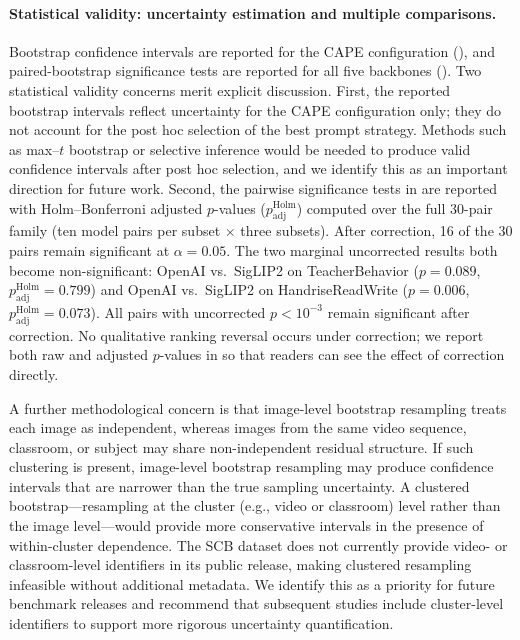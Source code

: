 \documentclass[symmetry,article,submit,pdftex,moreauthors]{Definitions/mdpi}
\begin{document}
\paragraph{Statistical validity: uncertainty estimation and multiple comparisons.}
Bootstrap confidence intervals are reported for the CAPE configuration (), and paired-bootstrap significance tests are reported for all five backbones (). Two statistical validity concerns merit explicit discussion. First, the reported bootstrap intervals reflect uncertainty for the CAPE configuration only; they do not account for the post hoc selection of the best prompt strategy. Methods such as max--$t$ bootstrap or selective inference would be needed to produce valid confidence intervals after post hoc selection, and we identify this as an important direction for future work. Second, the pairwise significance tests in  are reported with Holm--Bonferroni adjusted $p$-values ($p_{\text{adj}}^{\text{Holm}}$) computed over the full 30-pair family (ten model pairs per subset $\times$ three subsets). After correction, 16 of the 30 pairs remain significant at $\alpha=0.05$. The two marginal uncorrected results both become non-significant: OpenAI vs.\ SigLIP2 on TeacherBehavior ($p=0.089$, $p_{\text{adj}}^{\text{Holm}}=0.799$) and OpenAI vs.\ SigLIP2 on HandriseReadWrite ($p=0.006$, $p_{\text{adj}}^{\text{Holm}}=0.073$). All pairs with uncorrected $p<10^{-3}$ remain significant after correction. No qualitative ranking reversal occurs under correction; we report both raw and adjusted $p$-values in  so that readers can see the effect of correction directly.

A further methodological concern is that image-level bootstrap resampling treats each image as independent, whereas images from the same video sequence, classroom, or subject may share non-independent residual structure. If such clustering is present, image-level bootstrap resampling may produce confidence intervals that are narrower than the true sampling uncertainty. A clustered bootstrap---resampling at the cluster (e.g., video or classroom) level rather than the image level---would provide more conservative intervals in the presence of within-cluster dependence. The SCB dataset does not currently provide video- or classroom-level identifiers in its public release, making clustered resampling infeasible without additional metadata. We identify this as a priority for future benchmark releases and recommend that subsequent studies include cluster-level identifiers to support more rigorous uncertainty quantification.
\end{document}

